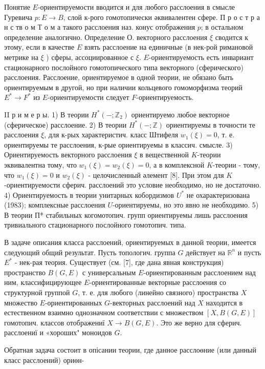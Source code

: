 \documentclass[10pt]{article}
\begin{document}
Понятие $E$-ориентируемости вводится и для любого расслоения в смысле Гуревича $p: E \rightarrow B$, слой к-рого гомотопически әквивалентен сфере. П р о с т р а н с тв о м Т о м а такого расслоения наз. конус отображения $p$; в остальном определение аналогично. Определение О. векторного расслоения $\xi$ сводится к этому, если в качестве $E$ взять расслоение на единичные (в нек-рой римановой метрике на $\xi$ ) сферы, ассоциированное с $\xi$. $E$-ориентируемость есть инвариант стационарного послойного гомотопического типа векторного (сферического) расслоения. Расслоение, ориентируемое в одной теории, не обязано быть ориентируемым в другой, но при наличии кольцевого гомоморфизма теорий $E^{*} \rightarrow F^{*}$ из $E$-ориентируемости следует $F$-ориентируемость.



II р и м е р ы. 1) В теории $H^{*}\left(-; \mathbb{Z}_{2}\right)$ ориентируемо любое векторное (сферическое) расслоение. 2) В теории $H^{*}(-; \mathbb{Z})$ ориентируемы в точности те расслоения $\xi$, для к-рых характеристич. класс Штифеля $w_{1}(\xi)=0$, т. е. ориентируемы те расслоения, к-рые ориентируемы в классич. смысле. 3) Ориентируемость векторного расслоения $\xi$ в вещественной $K$-теории эквивалентна тому, что $w_{1}(\xi)=w_{2}(\xi)=0$, а в комплексной $K$-теории - тому, что $w_{1}(\xi)=0$ и $w_{2}(\xi)$ - целочисленный әлемент [8]. При этом для $K$-ориентируемости сферич. расслоений это условие необходимо, но не достаточно. 4) Ориентируемость в теории унитарных кобордизмов $U^{*}$ не охарактеризована (1983); комплексные расслоения $U$-ориентируемы, но это явно не необходимо. 5) В теории П* стабильных когомотопич. групп ориентируемы лишь расслоения тривиального стационарного послойного гомотопич. типа.



В задаче описания класса расслоений, ориентируемых в данной теории, имеется следующий общий результат. Пусть топологич. группа $G$ действует на $\mathbb{R}^{n}$ и пусть $E^{*}$ - нек-рая теория. Существует (см. [7], где дана явная конструкция) пространство $B(G, E)$ с универсальным $E$-ориентированным расслоением над ним, классифицирующее $E$-ориентированные векторные расслоения со структурной группой $G$, т. е. для любого (линейно связного) пространства $X$ множество $E$-ориентированных $G$-векторных расслоений над $X$ находится в естественном взаимно однозначном соответствии с множеством $[X, B(G, E)]$ гомотопич. классов отображениї $X \rightarrow B(G, E)$. Это же верно для сферич. расслоениї и «хороших" моноидов $G$.



Обратная задача состоит в опісании теории, где данное расслоөние (или данный класс расслоений) ориөн-
\end{document}
